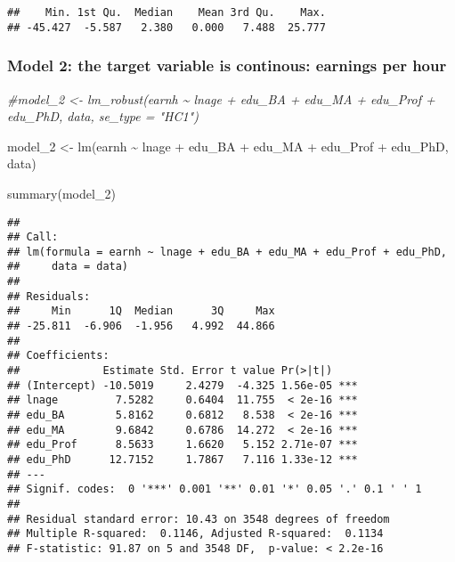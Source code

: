 \documentclass[
]{article}
\newenvironment{Shaded}{\begin{snugshade}}{\end{snugshade}}
\newcommand{\CommentTok}[1]{\textcolor[rgb]{0.56,0.35,0.01}{\textit{#1}}}
\newcommand{\FunctionTok}[1]{\textcolor[rgb]{0.00,0.00,0.00}{#1}}
\newcommand{\NormalTok}[1]{#1}
\newcommand{\OtherTok}[1]{\textcolor[rgb]{0.56,0.35,0.01}{#1}}
\newcommand{\SpecialCharTok}[1]{\textcolor[rgb]{0.00,0.00,0.00}{#1}}
\begin{document}
\begin{Shaded}
\end{Shaded}

\begin{verbatim}
##    Min. 1st Qu.  Median    Mean 3rd Qu.    Max. 
## -45.427  -5.587   2.380   0.000   7.488  25.777
\end{verbatim}

\hypertarget{model-2-the-target-variable-is-continous-earnings-per-hour}{%
\subsubsection{Model 2: the target variable is continous: earnings per
hour}\label{model-2-the-target-variable-is-continous-earnings-per-hour}}

\begin{Shaded}
\begin{Highlighting}[]
\CommentTok{\#model\_2 \textless{}{-} lm\_robust(earnh  \textasciitilde{}  lnage + edu\_BA + edu\_MA + edu\_Prof + edu\_PhD, data, se\_type = "HC1")}

\NormalTok{model\_2 }\OtherTok{\textless{}{-}} \FunctionTok{lm}\NormalTok{(earnh  }\SpecialCharTok{\textasciitilde{}}\NormalTok{  lnage }\SpecialCharTok{+}\NormalTok{ edu\_BA }\SpecialCharTok{+}\NormalTok{ edu\_MA }\SpecialCharTok{+}\NormalTok{ edu\_Prof }\SpecialCharTok{+}\NormalTok{ edu\_PhD, data)}

\FunctionTok{summary}\NormalTok{(model\_2)}
\end{Highlighting}
\end{Shaded}

\begin{verbatim}
## 
## Call:
## lm(formula = earnh ~ lnage + edu_BA + edu_MA + edu_Prof + edu_PhD, 
##     data = data)
## 
## Residuals:
##     Min      1Q  Median      3Q     Max 
## -25.811  -6.906  -1.956   4.992  44.866 
## 
## Coefficients:
##             Estimate Std. Error t value Pr(>|t|)    
## (Intercept) -10.5019     2.4279  -4.325 1.56e-05 ***
## lnage         7.5282     0.6404  11.755  < 2e-16 ***
## edu_BA        5.8162     0.6812   8.538  < 2e-16 ***
## edu_MA        9.6842     0.6786  14.272  < 2e-16 ***
## edu_Prof      8.5633     1.6620   5.152 2.71e-07 ***
## edu_PhD      12.7152     1.7867   7.116 1.33e-12 ***
## ---
## Signif. codes:  0 '***' 0.001 '**' 0.01 '*' 0.05 '.' 0.1 ' ' 1
## 
## Residual standard error: 10.43 on 3548 degrees of freedom
## Multiple R-squared:  0.1146, Adjusted R-squared:  0.1134 
## F-statistic: 91.87 on 5 and 3548 DF,  p-value: < 2.2e-16
\end{verbatim}
\end{document}

